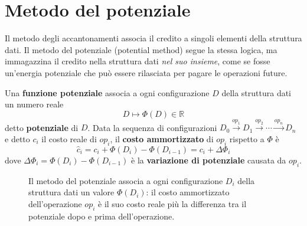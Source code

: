 \section{Metodo del potenziale}\label{sec:potenziale}
Il metodo degli accantonamenti associa il credito a singoli elementi della struttura dati. Il metodo del potenziale (potential method) segue la stessa logica, ma immagazzina il credito nella struttura dati \emph{nel suo insieme}, come se fosse un'energia potenziale che può essere rilasciata per pagare le operazioni future.

\begin{definizione}\label{def:potenziale}
Una \textbf{funzione potenziale} associa a ogni configurazione $D$ della struttura dati un numero reale
\[
D \longmapsto \Phi(D) \in \mathbb{R}
\]
detto \textbf{potenziale} di $D$. Data la sequenza di configurazioni $D_0 \xrightarrow{op_1} D_1 \xrightarrow{op_2} \cdots \xrightarrow{op_n} D_n$ e detto $c_i$ il costo reale di $op_i$, il \textbf{costo ammortizzato} di $op_i$ rispetto a $\Phi$ è
\[
\hat{c}_i = c_i + \Phi(D_i) - \Phi(D_{i-1}) = c_i + \Delta\Phi_i
\]
dove $\Delta\Phi_i = \Phi(D_i) - \Phi(D_{i-1})$ è la \textbf{variazione di potenziale} causata da $op_i$.
\end{definizione}

\begin{figure}[htbp]
\centering
{}
\caption{Il metodo del potenziale associa a ogni configurazione $D_i$ della struttura dati un valore $\Phi(D_i)$: il costo ammortizzato dell'operazione $op_i$ è il suo costo reale più la differenza tra il potenziale dopo e prima dell'operazione.}
\label{fig:potenziale}
\end{figure}

